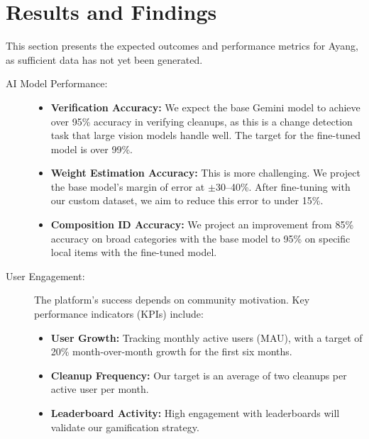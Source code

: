 \chapter[Results and Findings]{Results and Findings}
\label{cp:Results-and-Findings}

{
	\parindent0pt
	This section presents the expected outcomes and performance metrics for Ayang, as sufficient data has not yet been generated.

	\begin{description}
		\item[AI Model Performance:]

		      \begin{itemize}
			      \item \textbf{Verification Accuracy:} We expect the base Gemini model to achieve over 95\% accuracy in verifying cleanups, as this is a change detection task that large vision models handle well. The target for the fine-tuned model is over 99\%.

			      \item \textbf{Weight Estimation Accuracy:} This is more challenging. We project the base model's margin of error at $\pm$30--40\%. After fine-tuning with our custom dataset, we aim to reduce this error to under 15\%.

			      \item \textbf{Composition ID Accuracy:} We project an improvement from 85\% accuracy on broad categories with the base model to 95\% on specific local items with the fine-tuned model.
		      \end{itemize}

		\item[User Engagement:] The platform's success depends on community motivation. Key performance indicators (KPIs) include:

		      \begin{itemize}
			      \item \textbf{User Growth:} Tracking monthly active users (MAU), with a target of 20\% month-over-month growth for the first six months.

			      \item \textbf{Cleanup Frequency:} Our target is an average of two cleanups per active user per month.

			      \item \textbf{Leaderboard Activity:} High engagement with leaderboards will validate our gamification strategy.
		      \end{itemize}


\end{description}}
